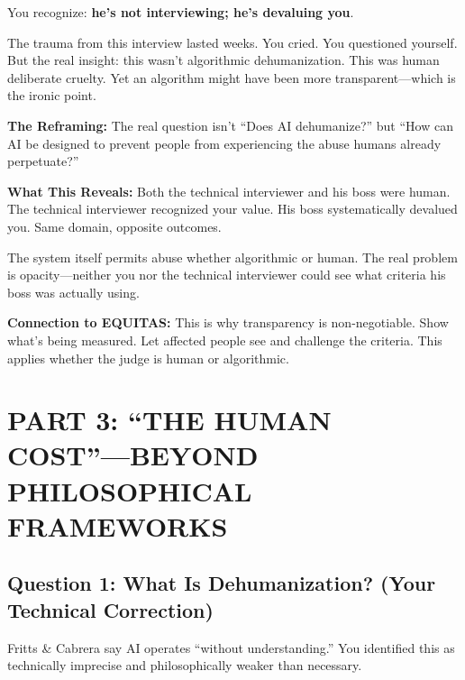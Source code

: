 \documentclass[12pt,letterpaper]{article}
\begin{document}
You recognize: \textbf{he's not interviewing; he's devaluing you}.

\begin{livedexperience}
The trauma from this interview lasted weeks. You cried. You questioned yourself. But the real insight: this wasn't algorithmic dehumanization. This was human deliberate cruelty. Yet an algorithm might have been more transparent---which is the ironic point.

\textbf{The Reframing:} The real question isn't ``Does AI dehumanize?'' but ``How can AI be designed to prevent people from experiencing the abuse humans already perpetuate?''
\end{livedexperience}

\textbf{What This Reveals:}
Both the technical interviewer and his boss were human. The technical interviewer recognized your value. His boss systematically devalued you. Same domain, opposite outcomes. 

The system itself permits abuse whether algorithmic or human. The real problem is opacity—neither you nor the technical interviewer could see what criteria his boss was actually using.

\begin{puzzleplan}
\textbf{Connection to EQUITAS:} This is why transparency is non-negotiable. Show what's being measured. Let affected people see and challenge the criteria. This applies whether the judge is human or algorithmic.
\end{puzzleplan}

\newpage

\section{PART 3: ``THE HUMAN COST''---BEYOND PHILOSOPHICAL FRAMEWORKS}

\subsection{Question 1: What Is Dehumanization? (Your Technical Correction)}

Fritts \& Cabrera say AI operates ``without understanding.'' You identified this as technically imprecise and philosophically weaker than necessary.
\end{document}
